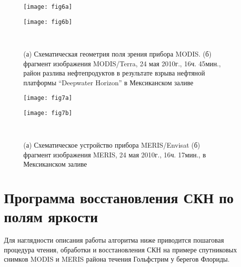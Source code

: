 \begin{figure}[H]
	\centering
	\begin{minipage}{.47\textwidth}
		\subcaptionbox{\label{fig:6a}}
	    {\texttt{[image: fig6a]}}
    \end{minipage}
    \hfill
    \begin{minipage}{.47\textwidth}
	    \subcaptionbox{\label{fig:6b}}
	    {\texttt{[image: fig6b]}}
    \end{minipage}
    \\
    \caption{(а) Схематическая геометрия поля зрения прибора MODIS. (б) фрагмент изображения MODIS/Terra, 24 мая 2010г., 16ч. 45мин., район разлива нефтепродуктов в результате взрыва нефтяной платформы ``Deepwater Horizon'' в Мексиканском заливе}
    \label{fig:6}

	\centering
	\begin{minipage}{.47\textwidth}
	    \subcaptionbox{\label{fig:7a}}
		{\texttt{[image: fig7a]}}
	\end{minipage}
	\hfill
	\begin{minipage}{.47\textwidth}
	    \subcaptionbox{\label{fig:7b}}
		{\texttt{[image: fig7b]}}
	\end{minipage}
	\\
    \caption{(а) Схематическое устройство прибора MERIS/Envisat (б) фрагмент изображения MERIS, 24 мая 2010г., 16ч. 17мин., в Мексиканском заливе}
    \label{fig:7}
\end{figure}



\newpage

\section{Программа восстановления СКН по полям яркости}

Для наглядности описания работы алгоритма ниже приводится пошаговая процедура чтения, обработки и восстановления СКН на примере спутниковых снимков MODIS и MERIS района течения Гольфстрим у берегов Флориды.



